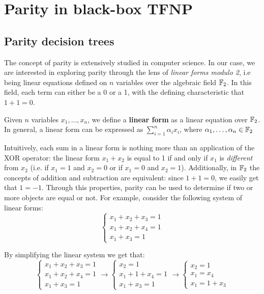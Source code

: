 
\chapter{Parity in black-box \textsf{TFNP}} \label{chap:parity-tfnp}

\section{Parity decision trees}

The concept of parity is extensively studied in computer science. In our case, we are interested in exploring parity through the lens of \textit{linear forms modulo 2}, i.e being linear equations defined on $n$ variables over the algebraic field $\mathbb{F}_2$. In this field, each term can either be a 0 or a 1, with the defining characteristic that $1+1 = 0$.

\begin{definition}
    Given $n$ variables $x_1, \ldots, x_n$, we define a \textbf{linear form} as a linear equation over $\mathbb{F}_2$. In general, a linear form can be expressed as $\sum\limits_{i = 1}^n \alpha_i x_i$, where $\alpha_1, \ldots, \alpha_n \in \mathbb{F}_2$
\end{definition}

Intuitively, each sum in a linear form is nothing more than an application of the XOR operator: the linear form $x_1 + x_2$ is equal to 1 if and only if $x_1$ is \textit{different} from $x_2$ (i.e. if $x_1 = 1$ and $x_2 = 0$ or if $x_1 = 0$ and $x_2 = 1$). Additionally, in $\mathbb{F}_2$ the concepts of addition and subtraction are equivalent: since $1+1 = 0$, we easily get that $1 = -1$. Through this properties, parity can be used to determine if two or more objects are equal or not. For example, consider the following system of linear forms:
\[\left \{ \begin{array}{l}
    x_1 + x_2 + x_3 = 1 \\
    x_1 + x_2 + x_4 = 1 \\
    x_1 + x_3 = 1
\end{array} \right .\]

By simplifying the linear system we get that:
\[\left \{ \begin{array}{l}
    x_1 + x_2 + x_3 = 1 \\
    x_1 + x_2 + x_4 = 1 \\
    x_1 + x_3 = 1
\end{array} \right . \longrightarrow
\left \{ \begin{array}{l}
    x_2 = 1\\
    x_1 + 1 + x_4 = 1 \\
    x_1 + x_3 = 1
\end{array} \right . \longrightarrow
\left \{ \begin{array}{l}
    x_2 = 1\\
    x_1 = x_4 \\
    x_1 = 1+x_3
\end{array} \right .\]

